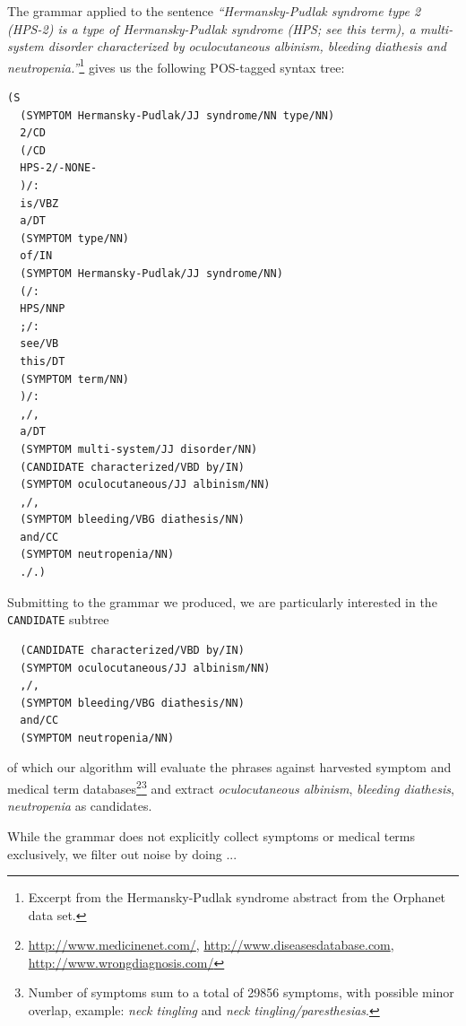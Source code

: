 \documentclass[10pt,letterpaper,final]{article}
\begin{document}

The grammar applied to the sentence \textit{``Hermansky-Pudlak syndrome
type 2 (HPS-2) is a type of Hermansky-Pudlak syndrome (HPS; see this
term), a multi-system disorder characterized by oculocutaneous albinism,
bleeding diathesis and neutropenia.''}\footnote{Excerpt from the
Hermansky-Pudlak syndrome abstract from the Orphanet data set.} gives us
the following POS-tagged syntax tree:
\begin{lstlisting}
(S
  (SYMPTOM Hermansky-Pudlak/JJ syndrome/NN type/NN)
  2/CD
  (/CD
  HPS-2/-NONE-
  )/:
  is/VBZ
  a/DT
  (SYMPTOM type/NN)
  of/IN
  (SYMPTOM Hermansky-Pudlak/JJ syndrome/NN)
  (/:
  HPS/NNP
  ;/:
  see/VB
  this/DT
  (SYMPTOM term/NN)
  )/:
  ,/,
  a/DT
  (SYMPTOM multi-system/JJ disorder/NN)
  (CANDIDATE characterized/VBD by/IN)
  (SYMPTOM oculocutaneous/JJ albinism/NN)
  ,/,
  (SYMPTOM bleeding/VBG diathesis/NN)
  and/CC
  (SYMPTOM neutropenia/NN)
  ./.)
\end{lstlisting}
Submitting to the grammar we produced, we are particularly interested in
the \texttt{CANDIDATE} subtree
\begin{lstlisting}
  (CANDIDATE characterized/VBD by/IN)
  (SYMPTOM oculocutaneous/JJ albinism/NN)
  ,/,
  (SYMPTOM bleeding/VBG diathesis/NN)
  and/CC
  (SYMPTOM neutropenia/NN)
\end{lstlisting}
of which our algorithm will evaluate the phrases against harvested
symptom and medical term
databases\footnote{\url{http://www.medicinenet.com/},
\url{http://www.diseasesdatabase.com},
\url{http://www.wrongdiagnosis.com/}}\footnote{Number of symptoms sum to
a total of 29856 symptoms, with possible minor overlap, example:
\textit{neck tingling} and \textit{neck tingling/paresthesias}.} and extract
\textit{oculocutaneous albinism}, \textit{bleeding diathesis},
\textit{neutropenia} as candidates.

While the grammar does not explicitly collect symptoms or medical terms
exclusively, we filter out noise by doing ...

\end{document}
